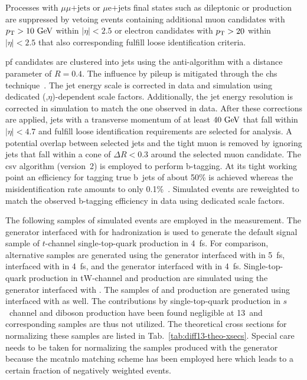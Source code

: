 
Processes with $\mu\mu\mathrm{\mbox{+}jets}$ or $\mu\mathrm{e}\mathrm{\mbox{+}jets}$ final states such as dileptonic \ttbar or \zjets production are suppressed by vetoing events containing additional muon candidates with $p_\textrm{T}>10~\textrm{GeV}$ within $|\eta|<2.5$ or electron candidates with $p_\textrm{T}>20$ within $|\eta|<2.5$ that also corresponding fulfill loose identification criteria.

\Gls{pf} candidates are clustered into jets using the anti-\kt algorithm with a distance parameter of $R=0.4$. The influence by pileup is mitigated through the \gls{chs} technique~\cite{CMS-PAS-JME-14-001}. The jet energy scale is corrected in data and simulation using dedicated (\pt,$\eta$)-dependent scale factors. Additionally, the jet energy resolution is corrected in simulation to match the one observed in data. After these corrections are applied, jets with a transverse momentum of at least $40~\textrm{GeV}$ that fall within $|\eta|<4.7$ and fulfill loose identification requirements are selected for analysis. A potential overlap between selected jets and the tight muon is removed by ignoring jets that fall within a cone of $\Delta R<0.3$ around the selected muon candidate. The \acrfull{csv} algorithm (version~2) is employed to perform b-tagging. At its tight working point an efficiency for tagging true b~jets of about 50\% is achieved whereas the misidentification rate amounts to only 0.1\%~\cite{CMS-PAS-BTV-15-001}. Simulated events are reweighted to match the observed b-tagging efficiency in data using dedicated scale factors.

The following samples of simulated events are employed in the measurement. The \MGAMC generator interfaced with  for hadronization is used to generate the default signal sample of $t$-channel single-top-quark production in 4~\gls{fs}. For comparison, alternative samples are generated using the \MGAMC generator interfaced with  in 5~\gls{fs}, \MGAMC interfaced with \HERWIG in 4~\gls{fs}, and the \POWHEG generator interfaced with \PYTHIA in 4~\gls{fs}. Single-top-quark production in tW-channel and \ttbar production are simulated using the \POWHEG generator interfaced with . The samples of \wjets and \zjets production are generated using \MGAMC interfaced with  as well. The contributions by single-top-quark production in $s$~channel and diboson production have been found negligible at 13~\TeV and corresponding samples are thus not utilized. The theoretical cross sections for normalizing these samples are listed in Tab.~\ref{tab:diff13-theo-xsecs}. Special care needs to be taken for normalizing the samples produced with the \MGAMC generator because the \gls{mcatnlo} matching scheme has been employed here which leads to a certain fraction of negatively weighted events.

